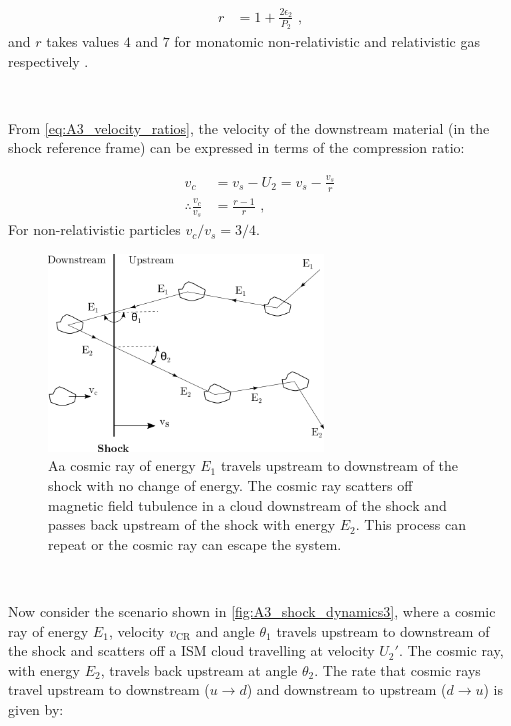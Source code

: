\begin{equation}
    \begin{aligned}
        r&=1+\frac{2\epsilon_2}{P_2}\text{ ,}
    \end{aligned}
\end{equation}
\noindent and $r$ takes values $4$ and $7$ for monatomic non-relativistic and relativistic gas respectively  \citep{1983RPPh...46..973D}.
\par~\par 
From \autoref{eq:A3_velocity_ratios}, the velocity of the downstream material (in the shock reference frame) can be expressed in terms of the compression ratio:

\begin{equation}
    \begin{aligned}
        v_c &=v_s-U_2=v_s-\frac{v_s}{r} \\
        \therefore \frac{v_c}{v_s}&=\frac{r-1}{r}\text{ ,}
    \end{aligned} \label{eq:down_upstream_v_ratio}
\end{equation}
\noindent For non-relativistic particles ${v_c}/{v_s}=3/4$.
\begin{figure}
	\centering
	\includegraphics[width=0.65\textwidth]{A3_Diffusive_Shock_Acceleration/Images/dsa.png}
	\caption{Aa cosmic ray of energy $E_1$ travels upstream to downstream of the shock with no change of energy. The cosmic ray scatters off magnetic field tubulence in a cloud downstream of the shock and passes back upstream of the shock with energy $E_2$. This process can repeat or the cosmic ray can escape the system.}
	\label{fig:A3_shock_dynamics3}
\end{figure}
\par~\par 
Now consider the scenario shown in \autoref{fig:A3_shock_dynamics3}, where a cosmic ray of energy $E_1$, velocity $v_\text{CR}$ and angle $\theta_1$ travels upstream to downstream of the shock and scatters off a ISM cloud travelling at velocity $U_2'$. The cosmic ray, with energy $E_2$, travels back upstream at angle $\theta_2$. The rate that cosmic rays travel upstream to downstream ($u\rightarrow d$) and downstream to upstream ($d\rightarrow u$) is given by:


